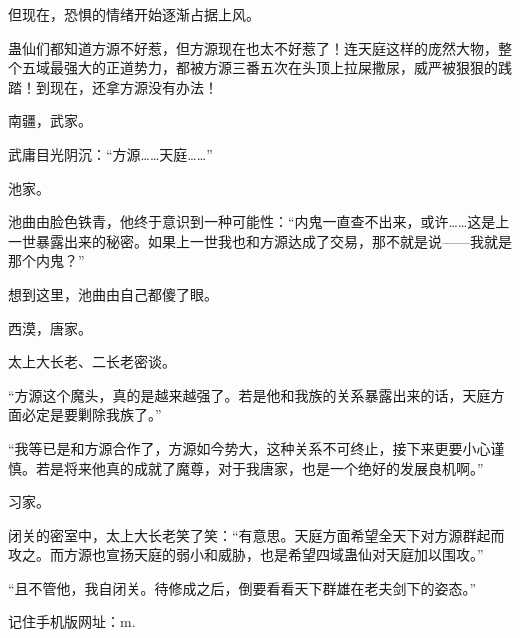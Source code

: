 \begin{this_body}
但现在，恐惧的情绪开始逐渐占据上风。

蛊仙们都知道方源不好惹，但方源现在也太不好惹了！连天庭这样的庞然大物，整个五域最强大的正道势力，都被方源三番五次在头顶上拉屎撒尿，威严被狠狠的践踏！到现在，还拿方源没有办法！

南疆，武家。

武庸目光阴沉：“方源……天庭……”

池家。

池曲由脸色铁青，他终于意识到一种可能性：“内鬼一直查不出来，或许……这是上一世暴露出来的秘密。如果上一世我也和方源达成了交易，那不就是说——我就是那个内鬼？”

想到这里，池曲由自己都傻了眼。

西漠，唐家。

太上大长老、二长老密谈。

“方源这个魔头，真的是越来越强了。若是他和我族的关系暴露出来的话，天庭方面必定是要剿除我族了。”

“我等已是和方源合作了，方源如今势大，这种关系不可终止，接下来更要小心谨慎。若是将来他真的成就了魔尊，对于我唐家，也是一个绝好的发展良机啊。”

习家。

闭关的密室中，太上大长老笑了笑：“有意思。天庭方面希望全天下对方源群起而攻之。而方源也宣扬天庭的弱小和威胁，也是希望四域蛊仙对天庭加以围攻。”

“且不管他，我自闭关。待修成之后，倒要看看天下群雄在老夫剑下的姿态。”

记住手机版网址：m.

\end{this_body}

